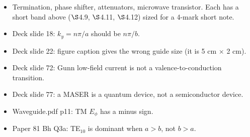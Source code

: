 \begin{itemize}
  \item Termination, phase shifter, attenuators, microwave transistor. Each has a short
    band above ($\S$4.9, $\S$4.11, $\S$4.12) sized for a 4-mark short note.
\end{itemize}

\begin{itemize}
  \item Deck slide 18: $k_y = n\pi/a$ should be $n\pi/b$.
  \item Deck slide 22: figure caption gives the wrong guide size (it is 5 cm $\times$ 2 cm).
  \item Deck slide 72: Gunn low-field current is not a valence-to-conduction transition.
  \item Deck slide 77: a MASER is a quantum device, not a semiconductor device.
  \item Waveguide.pdf p11: TM $E_\phi$ has a minus sign.
  \item Paper 81 Bh Q3a: TE$_{10}$ is dominant when $a > b$, not $b > a$.
\end{itemize}
